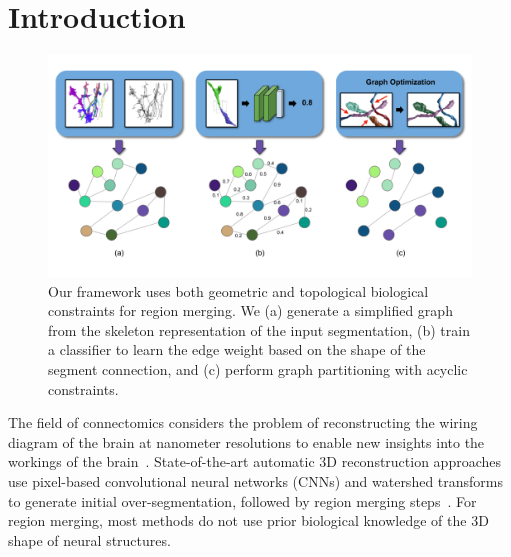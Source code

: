 \section{Introduction}

\begin{figure}[t!]
	\centering
	\includegraphics[width=\linewidth]{./figures/teaser_v4.png}
	\caption{Our framework uses both geometric and topological biological constraints for region merging. We (a) generate a simplified graph from the skeleton representation of the input segmentation, (b) train a classifier to learn the edge weight based on the shape of the segment connection, and (c) perform graph partitioning with acyclic constraints.}
	\label{fig:teaser_pipeline}
\end{figure}

The field of connectomics considers the problem of reconstructing the wiring diagram of the brain at nanometer resolutions to enable new insights into the workings of the brain~\cite{haehn2017scalable,kasthuri2015saturated}. 
State-of-the-art automatic 3D reconstruction approaches use pixel-based convolutional neural networks (CNNs) and watershed transforms to generate initial over-segmentation, followed by region merging steps~\cite{seymour2016rhoananet,lee2015recursive,nunez2014graph,parag2017anisotropic,ronneberger2015u,zlateski2015image}.
For region merging, most methods do not use prior biological knowledge of the 3D shape of neural structures.

